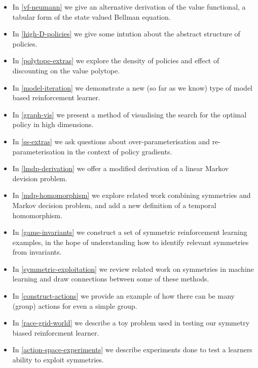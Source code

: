 \documentclass[12pt, a4paper, twoside, openright]{book}
\providecommand{\tightlist}{%
  \setlength{\itemsep}{0pt}\setlength{\parskip}{0pt}}
\begin{document}
\begin{itemize}
\tightlist
\item In \ref{vf-neumann} we give an alternative derivation of the value functional, a tabular form of the state valued Bellman equation.
\item In \ref{high-D-policies} we give some intution about the abstract structure of policies.
\item In \ref{polytope-extras} we explore the density of policies and effect of discounting on the value polytope.
\item In \ref{model-iteration} we demonstrate a new (so far as we know) type of model based reinforcement learner.
\item In \ref{graph-vis} we present a method of visualising the search for the optimal policy in high dimensions.
\item In \ref{ss-extras} we ask questions about over-parameterisation and re-parameterisation in the context of policy gradients.
\item In \ref{lmdp-derivation} we offer a modified derivation of a linear Markov devision problem.
\item In \ref{mdp-homomorphism} we explore related work combining symmetries and Markov decision problem, and add a new definition of a temporal homomorphism.
\item In \ref{game-invariants} we construct a set of symmetric reinforcement learning examples, in the hope of understanding how to identify relevant symmetries from invariants.
\item In \ref{symmetric-exploitation} we review related work on symmetries in machine learning and draw connections between some of these methods.
\item In \ref{construct-actions} we provide an example of how there can be many (group) actions for even a simple group.
\item In \ref{race-grid-world} we describe a toy problem used in testing our symmetry biased reinforcment learner.
\item In \ref{action-space-experiments} we describe experiments done to test a learners ability to exploit symmetries.
\end{itemize}



\end{document}
